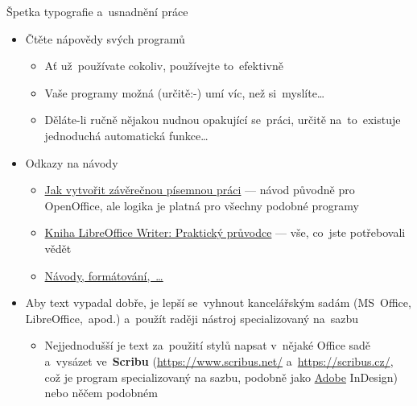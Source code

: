 \documentclass[compress, ucs, xelatex, 11pt, xcolor=svgnames, aspectratio=169,
	hyperref={
		bookmarks=true,
		unicode=true,
		colorlinks=true,
		pdftitle={Citacni software},
		plainpages=false,
		pdfauthor={Vojtech Zeisek},
		pdfsubject={Kratky uvod do citacniho software},
		pdfcreator={XeLaTeX},
		pdfkeywords={citace, reference, software, literatura},
		linkcolor=Crimson, %
		anchorcolor=Magenta, %
		citecolor=Magenta, %
		filecolor=Magenta, %
		menucolor=Magenta, %
		urlcolor=DarkTurquoise, %
		pdftex},
	url={hyphens, lowtilde} %
	]{beamer}
\begin{document}
\begin{frame}[allowframebreaks]{Špetka typografie a~usnadnění práce}
\begin{itemize}
\begin{itemize}
			\item \href{https://cs.wikipedia.org/wiki/Typografie}{Typografie} (grafická úprava textu) slouží k~tomu, aby~se~text dobře (pohodlně) četl (a~zároveň dobře vypadal)
			\item V~odborném textu sjednocuje styl psaní např. jednotek, odborných jmen apod., což~usnadňuje orientaci v~textu a~odstraňuje nejasnosti při čtení
			\item Pro angličtinu viz např. \href{https://authorservices.wiley.com/author-resources/book-authors/prepare-your-manuscript/house-style.html}{Wiley House Style}
		\end{itemize}
		\item Čtěte nápovědy svých programů
			\begin{itemize}
				\item Ať už~používate cokoliv, používejte to~efektivně
				\item Vaše programy možná (určitě:-) umí víc, než si~myslíte\ldots
				\item Děláte-li ručně nějakou nudnou opakující se~práci, určitě na~to~existuje jednoduchá automatická funkce\ldots
			\end{itemize}
		\item Odkazy na návody
			\begin{itemize}
				\item \href{https://www.linuxexpres.cz/kancelar/jak-vytvorit-zaverecnou-pisemnou-praci}{Jak vytvořit závěrečnou písemnou práci} --- návod původně pro OpenOffice, ale logika je platná pro všechny podobné programy
				\item \href{https://www.root.cz/knihy/libreoffice-writer-prakticky-pruvodce/}{Kniha LibreOffice Writer: Praktický průvodce} --- vše, co~jste potřebovali vědět
				\item \href{https://formatovani-dokumentu.cz/navody}{Návody, formátování,~\ldots}
			\end{itemize}
		\item Aby text vypadal dobře, je lepší se~vyhnout kancelářským sadám (MS~Office, LibreOffice,~apod.) a~použít raději nástroj specializovaný na~sazbu
			\begin{itemize}
				\item Nejjednodušší je text za~použití stylů napsat v~nějaké Office sadě a~vysázet ve~\textbf{Scribu} (\url{https://www.scribus.net/} a~\url{https://scribus.cz/}, což je program specializovaný na sazbu, podobně jako \href{https://www.natur.cuni.cz/fakulta/cit/podpora-uzivatelu/softwarove-licence/adobe}{Adobe} InDesign) nebo něčem podobném
			\end{itemize}
	\end{itemize}
\end{frame}
\end{document}
